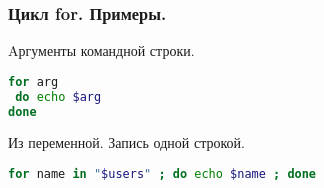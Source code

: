 \begin{frame}[fragile]
\frametitle{ Цикл for. Примеры.}
  \begin{block}{Aргументы командной строки.}
    \begin{lstlisting}[language=bash,frame=single]
for arg
 do echo $arg 
done
\end{lstlisting}
  \end{block}
  \begin{block}{Из переменной. Запись одной строкой.}
    \begin{lstlisting}[language=bash,frame=single]
for name in "$users" ; do echo $name ; done
\end{lstlisting}
  \end{block}
\end{frame}
